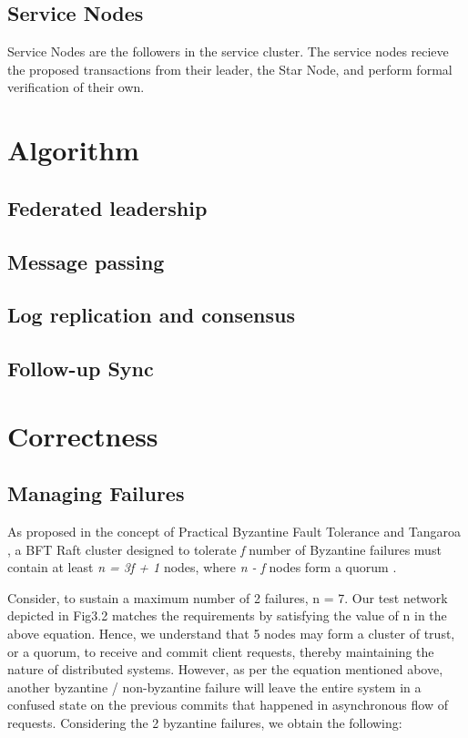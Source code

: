 \documentclass[]{article}
\begin{document}
\subsection{Service Nodes}
Service Nodes are the followers in the service cluster. 
The service nodes recieve the proposed transactions from their leader, the Star Node, and perform formal verification of their own.

\section{Algorithm}

\subsection{Federated leadership}

\subsection{Message passing}

\subsection{Log replication and consensus}

\subsection{Follow-up Sync}

\section{Correctness}
\subsection{Managing Failures}

As proposed in the concept of Practical Byzantine Fault Tolerance \cite{ARTICLE:1} and Tangaroa \cite{ARTICLE:3} , a BFT Raft cluster designed to tolerate \textit{f} number of Byzantine failures must contain at least \textit{n = 3f + 1} nodes, where \textit{n - f} nodes form a quorum \cite{ARTICLE:3}.

Consider, to sustain a maximum number of 2 failures, n = 7. Our test network depicted in Fig3.2 matches the requirements by satisfying the value of n in the above equation. Hence, we understand that 5 nodes may form a cluster of trust, or a quorum, to receive and commit client requests, thereby maintaining the nature of distributed systems. However, as per the equation mentioned above, another byzantine / non-byzantine failure will leave the entire system in a confused state on the previous commits that happened in asynchronous flow of requests.
Considering the 2 byzantine failures, we obtain the following:
\end{document}
